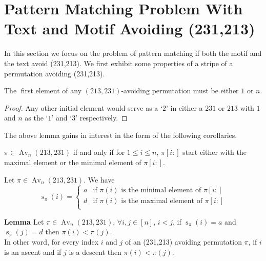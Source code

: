 \documentclass[a4paper]{llncs}
\DeclareMathOperator{\AV}{Av}
\DeclareMathOperator{\Avd}{Av}
\newcommand\Av[2]{\Avd_{{#1}}({#2})}
\DeclareMathOperator{\stripea}{s}
\newcommand{\stripe}[2]{\stripea_{{#1}}({#2})}
\newcounter{num}
\newcommand{\numl}[1]{\refstepcounter{num}\label{#1}}
\newcommand{\dstep}{d}
\newcommand{\ustep}{a}
\begin{document}
	\section{Pattern Matching Problem With Text and Motif Avoiding (231,213)}

		In this section we focus 
		on the problem of pattern matching if
		both the motif and the text
		avoid (231,213).
		We first exhibit some properties of a stripe 
		of a permutation avoiding (231,213).\\

		\begin{lemma}[Folklore]
		\label{lemma:first element is 1 or n}
		The 􏰅first element of any $(213,231)$-avoiding permutation
		must be either $1$ or $n$.
		\end{lemma}

		\begin{proof} 
		Any other initial element would serve as a `$2$' in either a 
		$231$ or $213$ with $1$ and $n$ as the `$1$' and `$3$' respectively.
		\end{proof}
			
		The above lemma gains in interest in the form of the following corollaries.

		\begin{corollary}
		$\pi \in \AV_n(213,231)$ if and only if for $1 \leq i \leq n$, 
		$\pi[i:]$ start either with the maximal element
		or the minimal element of $\pi[i:]$.
		\end{corollary}
	
		\begin{corollary}
		Let $\pi \in \AV_n(213,231)$. We have
		$$
		\stripe{\pi}{i} =
		\begin{cases}
   			\ustep & \text{if $\pi(i)$ is the minimal element of $\pi[i:]$}\\    
   			\dstep & \text{if $\pi(i)$ is the maximal element of $\pi[i:]$}\\
	 	\end{cases}
	 	$$
	 	\end{corollary}
	 
		\textbf{Lemma \numl{updown}  \thenum} Let $\pi \in \Av{n}{213,231}$,
		$\forall i,j \in [n]$, 
		$i<j$, 
		if $\stripe{\pi}{i}=\ustep$
		and $\stripe{\pi}{j}=\dstep$
		then $\pi(i)<\pi(j)$.\\ 
		
		In other word, for every index $i$ and $j$ of an (231,213) avoiding permutation $\pi$,
		if $i$ is an ascent and
		if $j$ is a descent
		then $\pi(i)<\pi(j)$.\\
		
\end{document}
